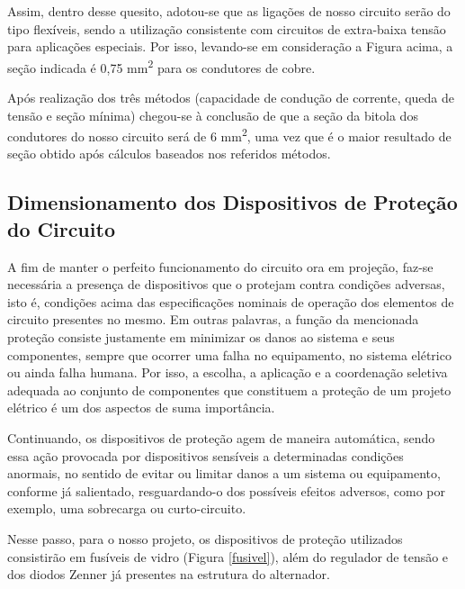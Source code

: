 Assim, dentro desse quesito, adotou-se que as ligações de nosso circuito serão do tipo flexíveis, sendo a utilização consistente com circuitos de extra-baixa tensão para aplicações especiais. Por isso, levando-se em consideração a Figura acima, a seção indicada é 0,75 mm\textsuperscript{2} para os condutores de cobre.
 	
 	Após realização dos três métodos (capacidade de condução de corrente, queda de tensão e seção mínima) chegou-se à conclusão de que a seção da bitola dos condutores do nosso circuito será de 6 mm\textsuperscript{2}, uma vez que é o maior resultado de seção obtido após cálculos baseados nos referidos métodos.
 	
\subsection{Dimensionamento dos Dispositivos de Proteção do Circuito}

A fim de manter o perfeito funcionamento do circuito ora em projeção, faz-se necessária a presença de dispositivos que o protejam contra condições adversas, isto é, condições acima das especificações nominais de operação dos elementos de circuito presentes no mesmo.
Em outras palavras, a função da mencionada proteção consiste justamente em minimizar os danos ao sistema e seus componentes, sempre que ocorrer uma falha no equipamento, no sistema elétrico ou ainda falha humana. Por isso, a escolha, a aplicação e a coordenação seletiva adequada ao conjunto de componentes que constituem a proteção de um projeto elétrico é um dos aspectos de suma importância.

Continuando, os dispositivos de proteção agem de maneira automática, sendo essa ação provocada por dispositivos sensíveis a determinadas condições anormais, no sentido de evitar ou limitar danos a um sistema ou equipamento, conforme já salientado, resguardando-o dos possíveis efeitos adversos, como por exemplo, uma sobrecarga ou curto-circuito.

Nesse passo, para o nosso projeto, os dispositivos de proteção utilizados consistirão em fusíveis de vidro (Figura \ref{fusivel}), além do regulador de tensão e dos diodos Zenner já presentes na estrutura do alternador.

